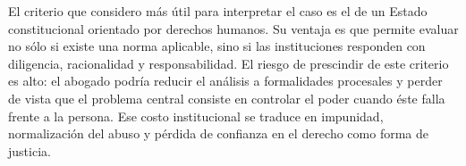 \documentclass[
	spanish,
	letterpaper, oneside
]{article}
\newcommand{\pendiente}[1]{\textcolor{red}{[PENDIENTE: #1]}}
\begin{document}
El criterio que considero más útil para interpretar el caso es el de un Estado constitucional orientado por derechos humanos. Su ventaja es que permite evaluar no sólo si existe una norma aplicable, sino si las instituciones responden con diligencia, racionalidad y responsabilidad. El riesgo de prescindir de este criterio es alto: el abogado podría reducir el análisis a formalidades procesales y perder de vista que el problema central consiste en controlar el poder cuando éste falla frente a la persona. Ese costo institucional se traduce en impunidad, normalización del abuso y pérdida de confianza en el derecho como forma de justicia.

%
%
%
%
\end{document}
